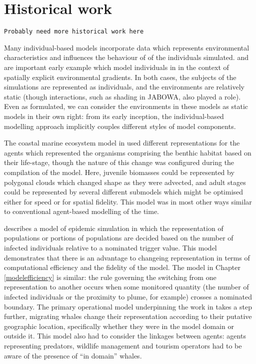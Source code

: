{\section{Historical work}

\texttt{Probably need more historical work here}
    
Many individual-based models incorporate data which represents
environmental characteristics and influences the behaviour of of the
individuals simulated. \citet{Botkin72:2} and \citet{deangelis1978model}
are important early example which model individuals in in the context
of spatially explicit environmental gradients. In both cases, the
subjects of the simulations are represented as individuals, and the
environments are relatively static (though interactions, such as
shading in JABOWA, also played a role).  Even as formulated, we can
consider the environments in these models as static models in their
own right: from its early inception, the individual-based modelling
approach implicitly couples different styles of model components.

The coastal marine ecosystem model in \cite{Gray06:1} used different
representations for the agents which represented the organisms
comprising the benthic habitat based on their life-stage, though the
nature of this change was configured during the compilation of the
model.  Here, juvenile biomasses could be represented by polygonal
clouds which changed shape as they were advected, and adult stages
could be represented by several different submodels which might be
optimised either for speed or for spatial fidelity.  This model was in
most other ways similar to conventional agent-based modelling of the
time.


\cite{bobashev2007hybrid} describes a model of epidemic simulation in
which the representation of populations or portions of populations are
decided based on the number of infected individuals relative to a
nominated trigger value. This model demonstrates that there is an
advantage to changeing representation in terms of computational
efficiency and the fidelity of the model. The model in Chapter
\ref{modelefficiency} is similar: the rule governing the switching
from one representation to another occurs when some monitored quantity
(the number of infected individuals or the proximity to plume, for
example) crosses a nominated boundary.  The primary operational model
underpinning the work in \cite{Fulton2009crossingscales} takes a step
further, migrating whales change their representation according to
their putative geographic location, specifically whether they were in
the model domain or outside it. This model also had to consider the
linkages between agents: agents representing predators, wildlife
management and tourism operators had to be aware of the presence of
``in domain'' whales.

}
